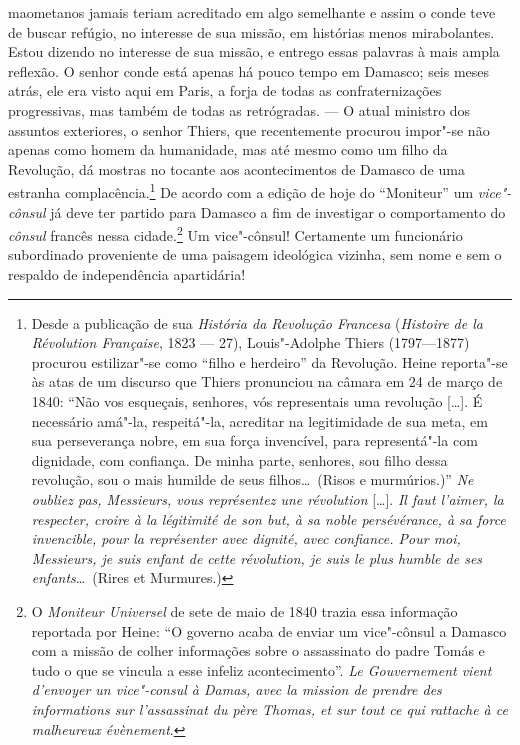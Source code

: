 maometanos jamais teriam acreditado em algo semelhante e assim o conde
teve de buscar refúgio, no interesse de sua missão, em histórias menos
mirabolantes. Estou dizendo no interesse de sua missão, e entrego essas
palavras à mais ampla reflexão. O senhor conde está apenas há pouco
tempo em Damasco; seis meses atrás, ele era visto aqui em Paris, a
forja de todas as confraternizações progressivas, mas também de todas
as retrógradas. --- O atual ministro dos assuntos exteriores, o senhor
Thiers, que recentemente procurou impor"-se não apenas como homem da
humanidade, mas até mesmo como um filho da Revolução, dá mostras no
tocante aos acontecimentos de Damasco de uma estranha
complacência.\footnote{ Desde a publicação de sua \textit{História da
Revolução Francesa} (\textit{Histoire de la Révolution Française}, 1823
--- 27), Louis"-Adolphe Thiers (1797---1877) procurou estilizar"-se
como “filho e herdeiro” da Revolução. Heine reporta"-se às atas de um
discurso que Thiers pronunciou na câmara em 24 de março de 1840: “Não
vos esqueçais, senhores, vós representais uma revolução [\ldots]. É
necessário amá"-la, respeitá"-la, acreditar na legitimidade de sua
meta, em sua perseverança nobre, em sua força invencível, para
representá"-la com dignidade, com confiança. De minha parte, senhores,
sou filho dessa revolução, sou o mais humilde de seus filhos\ldots\ (Risos
e murmúrios.)” \textit{Ne oubliez pas, Messieurs, vous représentez
une révolution }[\ldots].\textit{ Il faut l’aimer, la respecter, croire à
la légitimité de son but, à sa noble persévérance, à sa force
invencible, pour la représenter avec dignité, avec confiance. Pour moi,
Messieurs, je suis enfant de cette révolution, je suis le plus humble
de ses enfants}\ldots\ (Rires et Murmures.)} De acordo com a edição
de hoje do “Moniteur” um \textit{vice"-cônsul} já deve ter partido
para Damasco a fim de investigar o comportamento do \textit{cônsul}
francês nessa cidade.\footnote{ O \textit{Moniteur Universel} de sete
de maio de 1840 trazia essa informação reportada por Heine: “O governo
acaba de enviar um vice"-cônsul a Damasco com a missão de colher
informações sobre o assassinato do padre Tomás e tudo o que se vincula
a esse infeliz acontecimento”. \textit{Le Gouvernement vient
d’envoyer un vice"-consul à Damas, avec la mission de prendre des
informations sur l’assassinat du père Thomas, et sur tout ce qui
rattache à ce malheureux évènement}. } Um vice"-cônsul! Certamente
um funcionário subordinado proveniente de uma paisagem ideológica
vizinha, sem nome e sem o respaldo de independência apartidária!


